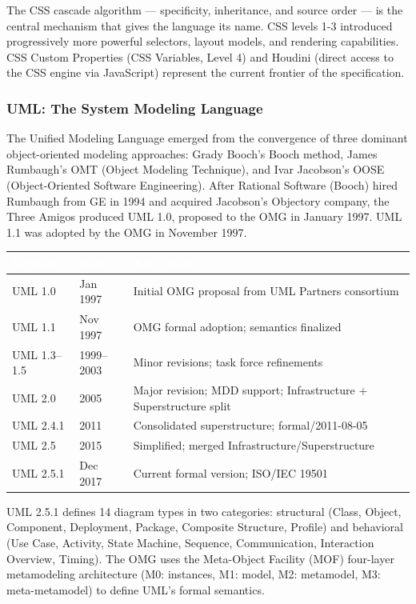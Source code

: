 \documentclass[11pt,letterpaper]{article}
\newcommand{\tableheader}[1]{\textbf{\sffamily\textcolor{white}{#1}}}
\begin{document}
The CSS cascade algorithm --- specificity, inheritance, and source order --- is the central mechanism that gives the language its name. CSS levels 1-3 introduced progressively more powerful selectors, layout models, and rendering capabilities. CSS Custom Properties (CSS Variables, Level 4) and Houdini (direct access to the CSS engine via JavaScript) represent the current frontier of the specification.

\subsubsection{UML: The System Modeling Language}

The Unified Modeling Language emerged from the convergence of three dominant object-oriented modeling approaches: Grady Booch's Booch method, James Rumbaugh's OMT (Object Modeling Technique), and Ivar Jacobson's OOSE (Object-Oriented Software Engineering). After Rational Software (Booch) hired Rumbaugh from GE in 1994 and acquired Jacobson's Objectory company, the Three Amigos produced UML 1.0, proposed to the OMG in January 1997. UML 1.1 was adopted by the OMG in November 1997.

\begin{center}
\begin{tabularx}{\textwidth}{L{2cm}L{2.5cm}X}
\toprule
{}
\tableheader{Version} & \tableheader{Date} & \tableheader{Key Change} \\
\midrule
UML 1.0 & Jan 1997 & Initial OMG proposal from UML Partners consortium \\
UML 1.1 & Nov 1997 & OMG formal adoption; semantics finalized \\
UML 1.3--1.5 & 1999--2003 & Minor revisions; task force refinements \\
UML 2.0 & 2005 & Major revision; MDD support; Infrastructure + Superstructure split \\
UML 2.4.1 & 2011 & Consolidated superstructure; formal/2011-08-05 \\
UML 2.5 & 2015 & Simplified; merged Infrastructure/Superstructure \\
UML 2.5.1 & Dec 2017 & Current formal version; ISO/IEC 19501 \\
\bottomrule
\end{tabularx}
\end{center}

UML 2.5.1 defines 14 diagram types in two categories: structural (Class, Object, Component, Deployment, Package, Composite Structure, Profile) and behavioral (Use Case, Activity, State Machine, Sequence, Communication, Interaction Overview, Timing). The OMG uses the Meta-Object Facility (MOF) four-layer metamodeling architecture (M0: instances, M1: model, M2: metamodel, M3: meta-metamodel) to define UML's formal semantics.
\end{document}
